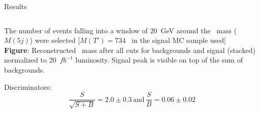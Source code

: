 \begin{frame}{Results}
\vspace{-.2cm}

\begin{columns}
\begin{column}{.50\textwidth}
\begin{block}{}\scriptsize
The number of events falling into a window of $20$~GeV around the \Tp~mass ($M(5j)$) were selected [$M(T')=734$ \GeVcc~in the signal MC sample used]\\
\textbf{Figure}: Reconstructed \Tp~mass after all cuts for backgrounds and signal (stacked) normalized to 20~$fb^{-1}$ luminosity. Signal peak is visible on top of the sum of backgrounds.

\begin{center}
\end{center}

Discriminators:
\begin{equation*}                                               
\frac{S}{\sqrt{S+B}}=2.0\pm 0.3\, \mbox{and} \, \frac{S}{B}=0.06\pm 0.02                                               
\end{equation*}
\end{block}
\end{column}


\end{columns}
\end{frame}
